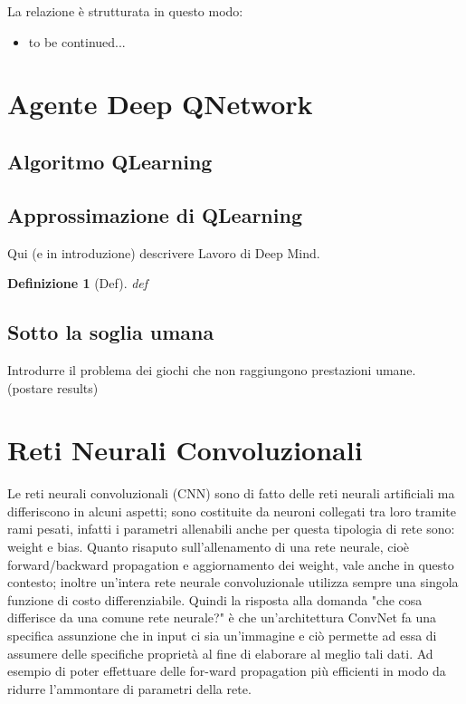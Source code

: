 \documentclass[twoside,twocolumn,10pt]{extarticle}
\theoremstyle{definition}
\begin{document}
	La relazione è strutturata in questo modo:
	\begin{itemize}
		\item to be continued...
	\end{itemize}
	
\section{Agente Deep Q\texttwelveudash Network}\label{sec:dqn-agent}
	\subsection{Algoritmo Q\texttwelveudash Learning}
	
	\subsection{Approssimazione di Q\texttwelveudash Learning}

	Qui (e in introduzione) descrivere Lavoro di Deep Mind.
	\theoremstyle{plain}
	\newtheorem{definition}{Definizione}
	\begin{definition}[Def]\label{def:}
		def
	\end{definition}

	\subsection{Sotto la soglia umana}
		Introdurre il problema dei giochi che non raggiungono prestazioni umane. (postare results)

\section{Reti Neurali Convoluzionali}\label{}
Le reti neurali convoluzionali (CNN) sono di fatto delle reti neurali artificiali ma differiscono in alcuni aspetti; sono costituite da neuroni collegati tra loro tramite rami pesati, infatti i parametri allenabili anche per questa tipologia di rete sono: weight e bias. Quanto risaputo sull'allenamento di una rete neurale, cioè forward/backward propagation e aggiornamento dei weight, vale anche in questo contesto; inoltre un'intera rete neurale convoluzionale utilizza sempre una singola funzione di costo differenziabile.
Quindi la risposta alla domanda "che cosa differisce da una comune rete neurale?" è che un'architettura ConvNet fa una specifica assunzione che in input ci sia un'immagine e ciò permette ad essa di assumere delle specifiche proprietà al fine di elaborare al meglio tali dati. Ad esempio di poter effettuare delle for-ward propagation più efficienti in modo da ridurre l'ammontare di parametri della rete.
\end{document}
